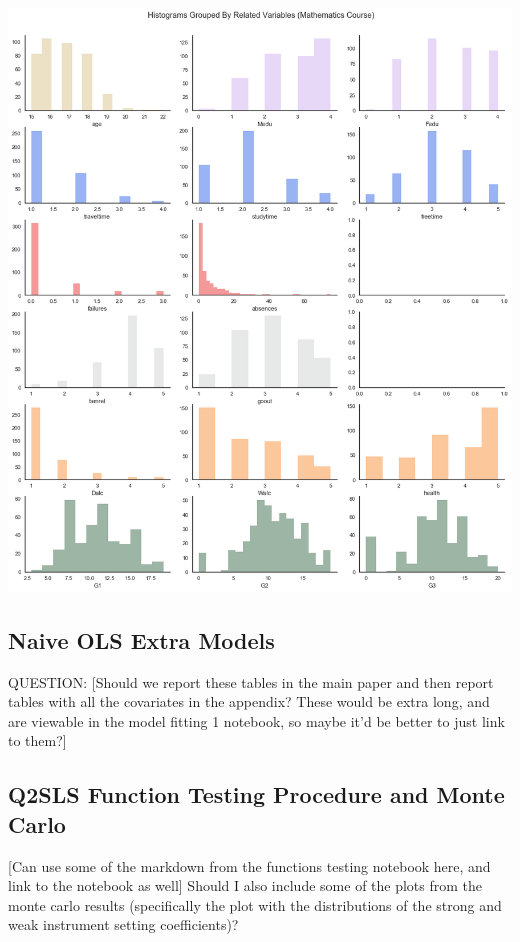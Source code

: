 \documentclass[12pt]{article}
\begin{document}
\includegraphics[scale=0.5]{figures/quantvar_hist_math.png}


\subsection{Naive OLS Extra Models} \label{appendix_naive}

QUESTION: \textcolor{BrickRed}{[Should we report these tables in the main paper and then report tables with all the covariates in the appendix? These would be extra long, and are viewable in the model fitting 1 notebook, so maybe it'd be better to just link to them?]}

\subsection{Q2SLS Function Testing Procedure and Monte Carlo} \label{appendix_function_testing}
\textcolor{BrickRed}{[Can use some of the markdown from the functions testing notebook here, and link to the notebook as well]} Should I also include some of the plots from the monte carlo results (specifically the plot with the distributions of the strong and weak instrument setting coefficients)?
\end{document}
